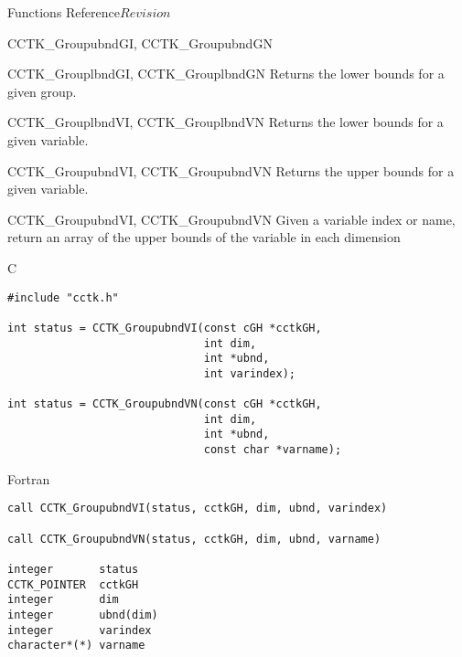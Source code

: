 \begin{cactuspart}{ Functions Reference}{}{$Revision$}
\begin{FunctionDescription}{CCTK\_GroupubndGI, CCTK\_GroupubndGN}
\begin{SeeAlsoSection}
\begin{SeeAlso}{CCTK\_GrouplbndGI, CCTK\_GrouplbndGN}
Returns the lower bounds for a given group.
\end{SeeAlso}
\begin{SeeAlso}{CCTK\_GrouplbndVI, CCTK\_GrouplbndVN}
Returns the lower bounds for a given variable.
\end{SeeAlso}
\begin{SeeAlso}{CCTK\_GroupubndVI, CCTK\_GroupubndVN}
Returns the upper bounds for a given variable.
\end{SeeAlso}
\end{SeeAlsoSection}
\end{FunctionDescription}


\begin{FunctionDescription}{CCTK\_GroupubndVI, CCTK\_GroupubndVN}
\label{CCTK-GroupubndVI}
\label{CCTK-GroupubndVN}
Given a variable index or name, return an array of the upper bounds of the variable in each dimension

\begin{SynopsisSection}
\begin{Synopsis}{C}
\begin{verbatim}
#include "cctk.h"

int status = CCTK_GroupubndVI(const cGH *cctkGH,
                              int dim,
                              int *ubnd,
                              int varindex);

int status = CCTK_GroupubndVN(const cGH *cctkGH,
                              int dim,
                              int *ubnd,
                              const char *varname);
\end{verbatim}
\end{Synopsis}
\begin{Synopsis}{Fortran}
\begin{verbatim}
call CCTK_GroupubndVI(status, cctkGH, dim, ubnd, varindex)

call CCTK_GroupubndVN(status, cctkGH, dim, ubnd, varname)

integer       status
CCTK_POINTER  cctkGH
integer       dim
integer       ubnd(dim)
integer       varindex
character*(*) varname
\end{verbatim}
\end{Synopsis}
\end{SynopsisSection}


\end{FunctionDescription}
\end{cactuspart}
